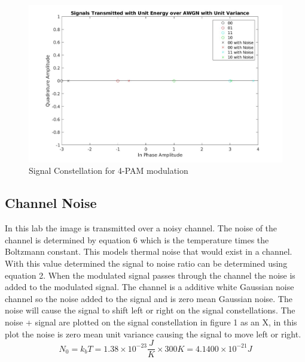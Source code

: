 \documentclass{article}
\begin{document}
\begin{figure}[!h]
        \centering 	\includegraphics[width=.8\linewidth]{signalconst.jpg}
    \caption{Signal Constellation for 4-PAM modulation}
\end{figure}
\subsection{Channel Noise}
In this lab the image is transmitted over a noisy channel. The noise of the channel is determined by equation 6 which is the temperature times the Boltzmann constant. This models thermal noise that would exist in a channel. With this value determined the signal to noise ratio can be determined using equation 2. When the modulated signal passes through the channel the noise is added to the modulated signal. The channel is a additive white Gaussian noise channel so the noise added to the signal and is zero mean Gaussian noise. The noise will cause the signal to shift left or right on the signal constellations. The noise + signal are plotted on the signal constellation in figure 1 as an X, in this plot the noise is zero mean unit variance causing the signal to move left or right.
\begin{equation}
    N_0 = k_bT = 1.38 \times 10 ^{-23} \frac{J}{K} \times 300K = 4.1400 \times 10^{-21} J
\end{equation}
\end{document}
